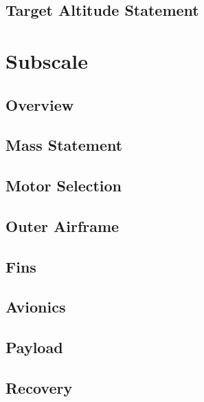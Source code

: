     \subsection{Target Altitude Statement}

\section{Subscale}

    \subsection{Overview}
    
    \subsection{Mass Statement}
    
    \subsection{Motor Selection}
    
    \subsection{Outer Airframe}
    
    \subsection{Fins}
    
    \subsection{Avionics}
    
    \subsection{Payload}
    
    \subsection{Recovery}
